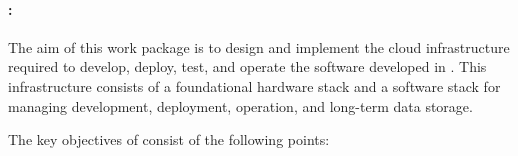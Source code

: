 
\paragraph{\WPCloud: \WPCloudTitle \\}

{\noindent\wptablefont
\label{wp5}

\wptableheaderB{\WPCloudVW}{\WPCloudETHZ}{\WPCloudIBM}{\WPCloudCLUJ}{\WPCloudPRAGUE}


The aim of this work package is to design and implement the cloud infrastructure
  required to develop, deploy, test, and operate the software developed in \Project.
This infrastructure consists of a
  foundational hardware stack
  and
  a software stack for managing development, deployment, operation, and long-term data storage.

%

The key objectives of \WPCloud consist of the following points:

}
